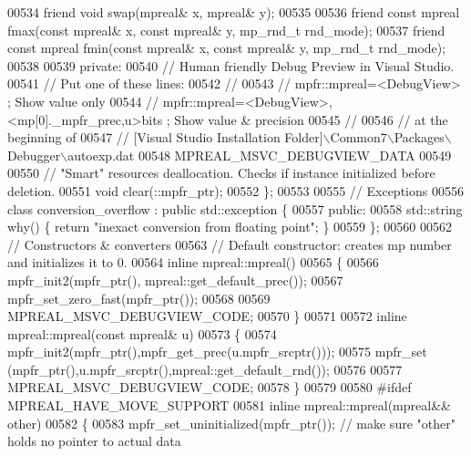 \begin{DoxyCode}
00534     \textcolor{keyword}{friend} \textcolor{keywordtype}{void} swap(mpreal& x, mpreal& y);
00535 
00536     \textcolor{keyword}{friend} \textcolor{keyword}{const} mpreal fmax(\textcolor{keyword}{const} mpreal& x, \textcolor{keyword}{const} mpreal& y, mp\_rnd\_t rnd\_mode);
00537     \textcolor{keyword}{friend} \textcolor{keyword}{const} mpreal fmin(\textcolor{keyword}{const} mpreal& x, \textcolor{keyword}{const} mpreal& y, mp\_rnd\_t rnd\_mode);
00538 
00539 \textcolor{keyword}{private}:
00540     \textcolor{comment}{// Human friendly Debug Preview in Visual Studio.}
00541     \textcolor{comment}{// Put one of these lines:}
00542     \textcolor{comment}{//}
00543     \textcolor{comment}{// mpfr::mpreal=<DebugView>                              ; Show value only}
00544     \textcolor{comment}{// mpfr::mpreal=<DebugView>, <mp[0].\_mpfr\_prec,u>bits    ; Show value & precision}
00545     \textcolor{comment}{//}
00546     \textcolor{comment}{// at the beginning of}
00547     \textcolor{comment}{// [Visual Studio Installation Folder]\(\backslash\)Common7\(\backslash\)Packages\(\backslash\)Debugger\(\backslash\)autoexp.dat}
00548     MPREAL\_MSVC\_DEBUGVIEW\_DATA
00549 
00550     \textcolor{comment}{// "Smart" resources deallocation. Checks if instance initialized before deletion.}
00551     \textcolor{keywordtype}{void} clear(::mpfr\_ptr);
00552 \};
00553 
00555 \textcolor{comment}{// Exceptions}
00556 \textcolor{keyword}{class }conversion\_overflow : \textcolor{keyword}{public} std::exception \{
00557 \textcolor{keyword}{public}:
00558     std::string why() \{ \textcolor{keywordflow}{return} \textcolor{stringliteral}{"inexact conversion from floating point"}; \}
00559 \};
00560 
00562 \textcolor{comment}{// Constructors & converters}
00563 \textcolor{comment}{// Default constructor: creates mp number and initializes it to 0.}
00564 \textcolor{keyword}{inline} mpreal::mpreal()
00565 \{
00566     mpfr\_init2(mpfr\_ptr(), mpreal::get\_default\_prec());
00567     mpfr\_set\_zero\_fast(mpfr\_ptr());
00568 
00569     MPREAL\_MSVC\_DEBUGVIEW\_CODE;
00570 \}
00571 
00572 \textcolor{keyword}{inline} mpreal::mpreal(\textcolor{keyword}{const} mpreal& u)
00573 \{
00574     mpfr\_init2(mpfr\_ptr(),mpfr\_get\_prec(u.mpfr\_srcptr()));
00575     mpfr\_set  (mpfr\_ptr(),u.mpfr\_srcptr(),mpreal::get\_default\_rnd());
00576 
00577     MPREAL\_MSVC\_DEBUGVIEW\_CODE;
00578 \}
00579 
00580 \textcolor{preprocessor}{#ifdef MPREAL\_HAVE\_MOVE\_SUPPORT}
00581 \textcolor{keyword}{inline} mpreal::mpreal(mpreal&& other)
00582 \{
00583     mpfr\_set\_uninitialized(mpfr\_ptr());     \textcolor{comment}{// make sure "other" holds no pointer to actual data}

\end{DoxyCode}
